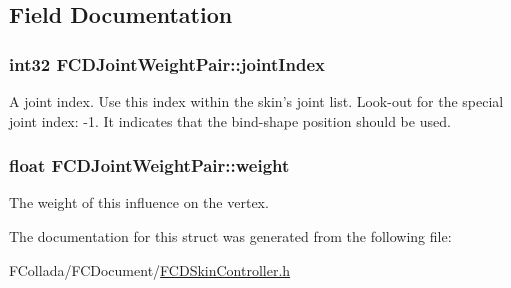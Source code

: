 \subsection{Field Documentation}
\hypertarget{structFCDJointWeightPair_a12f6483d8748e4cca1089064b1934a3b}{
\subsubsection[{jointIndex}]{\setlength{\rightskip}{0pt plus 5cm}int32 {\bf FCDJointWeightPair::jointIndex}}}
\label{structFCDJointWeightPair_a12f6483d8748e4cca1089064b1934a3b}
A joint index. Use this index within the skin's joint list. Look-\/out for the special joint index: -\/1. It indicates that the bind-\/shape position should be used. \hypertarget{structFCDJointWeightPair_a375a6320fef00a704bbdaf67097f8552}{
\subsubsection[{weight}]{\setlength{\rightskip}{0pt plus 5cm}float {\bf FCDJointWeightPair::weight}}}
\label{structFCDJointWeightPair_a375a6320fef00a704bbdaf67097f8552}
The weight of this influence on the vertex. 

The documentation for this struct was generated from the following file:\begin{DoxyCompactItemize}
\item 
FCollada/FCDocument/\hyperlink{FCDSkinController_8h}{FCDSkinController.h}\end{DoxyCompactItemize}
